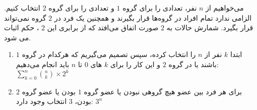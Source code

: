 می‌خواهیم از
$n$
 نفر، تعدادی را برای گروه
$1$
  و تعدادی را برای گروه
$2$
   انتخاب کنیم. الزامی ندارد تمام افراد در گروه‌ها قرار بگیرند و همچنین یک فرد در
$2$ 
   گروه نمی‌تواند قرار بگیرد. شمارش حالات به
$2$ 
   صورت اتفاق می‌افتد که از برابری این
$2$ 
    ، حکم اثبات می شود.
    \begin{enumerate}
        \item 
        ابتدا
$k$
         نفر از
$n$
          را انتخاب کرده، سپس تصمیم می‌گیریم که هرکدام در گروه 
$1$
         باشند یا در گروه
$2$ 
         و این کار را برای
$k$
          های 
$0$ 
          تا
$n$ 
          باید انجام می‌دهیم:
        \(\displaystyle\sum_{k=0}^{n} {\binom{n}{k}\times2^k}\)
        \item
       برای هر فرد بین عضو هیچ گروهی نبودن یا عضو گروه 
$1$ 
        بودن یا عضو گروه 
$2$ 
        بودن،
$3$ 
        انتخاب وجود دارد:
        \(3^n\)
    \end{enumerate}